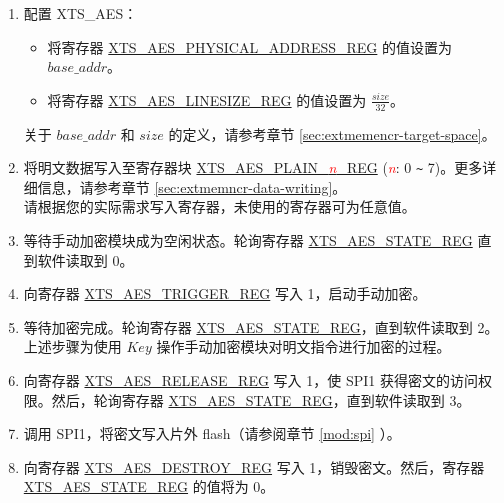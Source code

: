 \documentclass[main\_\_CN.tex]{subfiles}
\begin{document}
\begin{enumerate}

    \item 配置 XTS\_AES：
    \begin{itemize}
        \item 将寄存器 \hyperref[regdesc:XTSAESPHYSICALADDRESSREG]{XTS\_AES\_PHYSICAL\_ADDRESS\_REG} 的值设置为 \begin{math}base\_addr\end{math}。
        \item 将寄存器 \hyperref[regdesc:XTSAESLINESIZEREG]{XTS\_AES\_LINESIZE\_REG} 的值设置为 \begin{math}\frac{size}{32}\end{math}。
    \end{itemize}
    关于 \begin{math} base\_addr\end{math} 和 \begin{math}size\end{math} 的定义，请参考章节 \ref{sec:extmemencr-target-space}。
    \item 将明文数据写入至寄存器块 \hyperref[regdesc:XTSAESPLAINNREG]{XTS\_AES\_PLAIN\_\textcolor{red}{\it{n}}\_REG} (\textcolor{red}{\it{n}}: 0 \verb+~+ 7)。更多详细信息，请参考章节 \ref{sec:extmemncr-data-writing}。\\请根据您的实际需求写入寄存器，未使用的寄存器可为任意值。

    \item 等待手动加密模块成为空闲状态。轮询寄存器 \hyperref[regdesc:XTSAESSTATEREG]{XTS\_AES\_STATE\_REG} 直到软件读取到 0。

    \item 向寄存器 \hyperref[regdesc:XTSAESTRIGGERREG]{XTS\_AES\_TRIGGER\_REG} 写入 1，启动手动加密。

    \item 等待加密完成。轮询寄存器 \hyperref[regdesc:XTSAESSTATEREG]{XTS\_AES\_STATE\_REG}，直到软件读取到 2。\\
    上述步骤为使用 \begin{math}Key\end{math} 操作手动加密模块对明文指令进行加密的过程。

    \item 向寄存器 \hyperref[regdesc:XTSAESRELEASEREG]{XTS\_AES\_RELEASE\_REG} 写入 1，使 SPI1 获得密文的访问权限。然后，轮询寄存器 \hyperref[regdesc:XTSAESSTATEREG]{XTS\_AES\_STATE\_REG}，直到软件读取到 3。

    \item 调用 SPI1，将密文写入片外 flash（请参阅章节 \ref{mod:spi} \textit{}）。

    \item 向寄存器 \hyperref[regdesc:XTSAESDESTROYREG]{XTS\_AES\_DESTROY\_REG} 写入 1，销毁密文。然后，寄存器 \hyperref[regdesc:XTSAESSTATEREG]{XTS\_AES\_STATE\_REG} 的值将为 0。

\end{enumerate}
\end{document}
